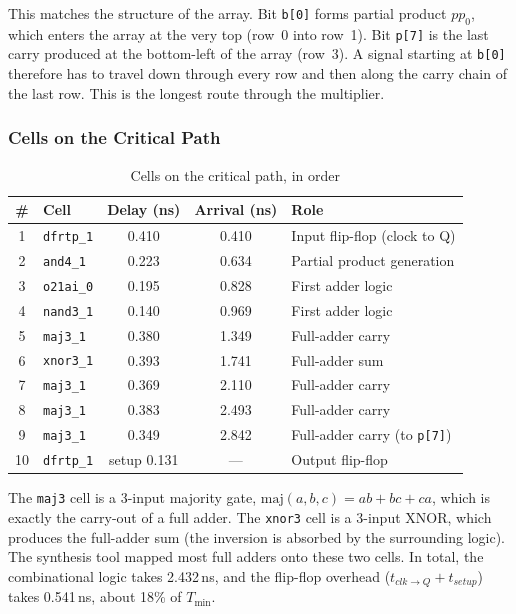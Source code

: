 \documentclass[11pt,a4paper]{article}
\begin{document}
This matches the structure of the array. Bit \texttt{b[0]} forms partial
product $pp_0$, which enters the array at the very top (row~0 into row~1).
Bit \texttt{p[7]} is the last carry produced at the bottom-left of the array
(row~3). A signal starting at \texttt{b[0]} therefore has to travel down
through every row and then along the carry chain of the last row. This is
the longest route through the multiplier.

\subsubsection{Cells on the Critical Path}

\begin{table}[H]
  \centering
  \begin{tabular}{clccl}
    \toprule
    \textbf{\#} & \textbf{Cell} & \textbf{Delay (ns)} & \textbf{Arrival (ns)} & \textbf{Role} \\
    \midrule
    1  & \texttt{dfrtp\_1}  & 0.410 & 0.410 & Input flip-flop (clock to Q) \\
    2  & \texttt{and4\_1}   & 0.223 & 0.634 & Partial product generation \\
    3  & \texttt{o21ai\_0}  & 0.195 & 0.828 & First adder logic \\
    4  & \texttt{nand3\_1}  & 0.140 & 0.969 & First adder logic \\
    5  & \texttt{maj3\_1}   & 0.380 & 1.349 & Full-adder carry \\
    6  & \texttt{xnor3\_1}  & 0.393 & 1.741 & Full-adder sum \\
    7  & \texttt{maj3\_1}   & 0.369 & 2.110 & Full-adder carry \\
    8  & \texttt{maj3\_1}   & 0.383 & 2.493 & Full-adder carry \\
    9  & \texttt{maj3\_1}   & 0.349 & 2.842 & Full-adder carry (to \texttt{p[7]}) \\
    10 & \texttt{dfrtp\_1}  & setup 0.131 & --- & Output flip-flop \\
    \bottomrule
  \end{tabular}
  \caption{Cells on the critical path, in order}
  \label{tab:critical_path}
\end{table}

The \texttt{maj3} cell is a 3-input majority gate,
$\text{maj}(a,b,c) = ab + bc + ca$, which is exactly the carry-out of a full
adder. The \texttt{xnor3} cell is a 3-input XNOR, which produces the full-adder
sum (the inversion is absorbed by the surrounding logic). The synthesis tool
mapped most full adders onto these two cells. In total, the combinational
logic takes 2.432\,ns, and the flip-flop overhead
($t_{clk\to Q} + t_{setup}$) takes 0.541\,ns, about 18\% of $T_{\min}$.
\end{document}
